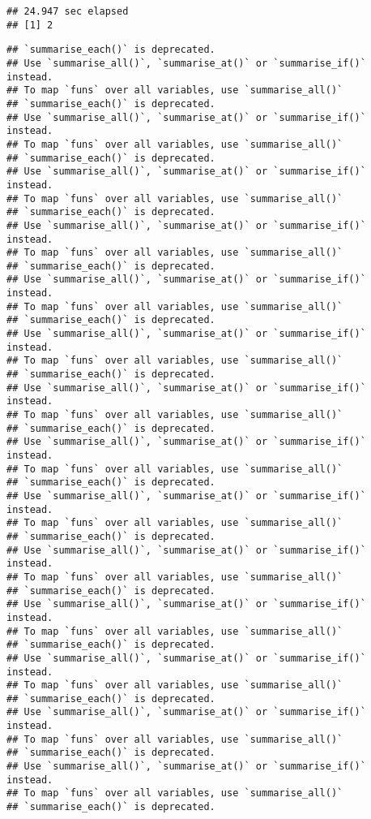 \documentclass[]{article}
\begin{document}
\begin{verbatim}
## 24.947 sec elapsed
## [1] 2
\end{verbatim}

\begin{verbatim}
## `summarise_each()` is deprecated.
## Use `summarise_all()`, `summarise_at()` or `summarise_if()` instead.
## To map `funs` over all variables, use `summarise_all()`
## `summarise_each()` is deprecated.
## Use `summarise_all()`, `summarise_at()` or `summarise_if()` instead.
## To map `funs` over all variables, use `summarise_all()`
## `summarise_each()` is deprecated.
## Use `summarise_all()`, `summarise_at()` or `summarise_if()` instead.
## To map `funs` over all variables, use `summarise_all()`
## `summarise_each()` is deprecated.
## Use `summarise_all()`, `summarise_at()` or `summarise_if()` instead.
## To map `funs` over all variables, use `summarise_all()`
## `summarise_each()` is deprecated.
## Use `summarise_all()`, `summarise_at()` or `summarise_if()` instead.
## To map `funs` over all variables, use `summarise_all()`
## `summarise_each()` is deprecated.
## Use `summarise_all()`, `summarise_at()` or `summarise_if()` instead.
## To map `funs` over all variables, use `summarise_all()`
## `summarise_each()` is deprecated.
## Use `summarise_all()`, `summarise_at()` or `summarise_if()` instead.
## To map `funs` over all variables, use `summarise_all()`
## `summarise_each()` is deprecated.
## Use `summarise_all()`, `summarise_at()` or `summarise_if()` instead.
## To map `funs` over all variables, use `summarise_all()`
## `summarise_each()` is deprecated.
## Use `summarise_all()`, `summarise_at()` or `summarise_if()` instead.
## To map `funs` over all variables, use `summarise_all()`
## `summarise_each()` is deprecated.
## Use `summarise_all()`, `summarise_at()` or `summarise_if()` instead.
## To map `funs` over all variables, use `summarise_all()`
## `summarise_each()` is deprecated.
## Use `summarise_all()`, `summarise_at()` or `summarise_if()` instead.
## To map `funs` over all variables, use `summarise_all()`
## `summarise_each()` is deprecated.
## Use `summarise_all()`, `summarise_at()` or `summarise_if()` instead.
## To map `funs` over all variables, use `summarise_all()`
## `summarise_each()` is deprecated.
## Use `summarise_all()`, `summarise_at()` or `summarise_if()` instead.
## To map `funs` over all variables, use `summarise_all()`
## `summarise_each()` is deprecated.
## Use `summarise_all()`, `summarise_at()` or `summarise_if()` instead.
## To map `funs` over all variables, use `summarise_all()`
## `summarise_each()` is deprecated.

\end{verbatim}
\end{document}
